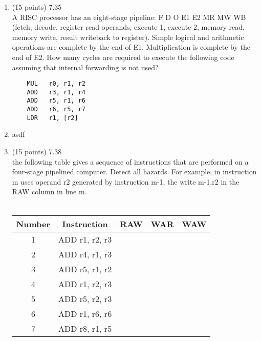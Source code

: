 \documentclass[letterpaper,10pt,onecolumn,titlepage]{article}
\begin{document}
\begin{enumerate}
\item (15 points) 7.35 \\
	A RISC processor has an eight-stage pipeline: F D O E1 E2 MR MW WB (fetch, decode,
	register read operands, execute 1, execute 2, memory read, memory write, result
	writeback to register). Simple logical and arithmetic operations are complete by
	the end of E1. Multiplication is complete by the end of E2. How many cycles are
	required to execute the following code assuming that internal forwarding is not
	used?
	\begin{verbatim}
	MUL   r0, r1, r2
	ADD   r3, r1, r4
	ADD   r5, r1, r6
	ADD   r6, r5, r7
	LDR   r1, [r2]
	\end{verbatim}
\item[\textbullet] asdf

\item (15 points) 7.38 \\
	the following table gives a sequence of instructions that are performed on a
	four-stage pipelined computer. Detect all hazards. For example, in instruction m
	uses operand r2 generated by instruction m-1, the write m-1,r2 in the RAW column
	in line m. \\
	\\
	\begin{tabular}{ c c c c c }
		Number & Instruction & RAW & WAR & WAW \\
		\hline
		1 & ADD r1, r2, r3 &   &   &   \\
		2 & ADD r4, r1, r3 &   &   &   \\
		3 & ADD r5, r1, r2 &   &   &   \\
		4 & ADD r1, r2, r3 &   &   &   \\
		5 & ADD r5, r2, r3 &   &   &   \\
		6 & ADD r1, r6, r6 &   &   &   \\
		7 & ADD r8, r1, r5 &   &   &   \\
	\end{tabular}\\

\end{enumerate}
\end{document}
